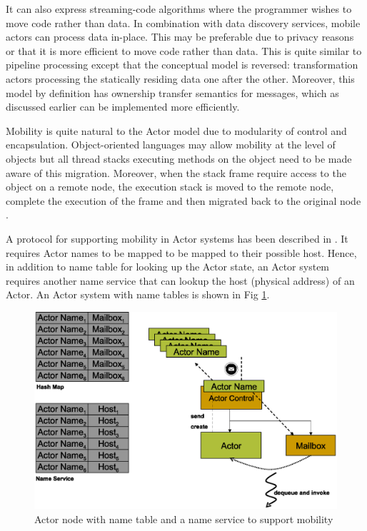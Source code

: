 It can also express streaming-code algorithms where the programmer wishes to move code rather than data. In combination with data discovery services, mobile actors can process data in-place. This may be preferable due to privacy reasons or that it is more efficient to move code rather than data. This is quite similar to pipeline processing except that the conceptual model is reversed: transformation actors processing the statically residing data one after the other. Moreover, this model by definition has ownership transfer semantics for messages, which as discussed earlier can be implemented more efficiently.

Mobility is quite natural to the Actor model due to modularity of control and encapsulation. Object-oriented languages may allow mobility at the level of objects but all thread stacks executing methods on the object need to be made aware of this migration. Moreover, when the stack frame require access to the object on a remote node, the execution stack is moved to the remote node, complete the execution of the frame and then migrated back to the original node \cite{walsh2000spm}.


A protocol for supporting mobility in Actor systems has been described in \cite{sc95}. It requires Actor names to be mapped to be mapped to their possible host. Hence, in addition to name table for looking up the Actor state, an Actor system requires another name service that can lookup the host (physical address) of an Actor. An Actor system with name tables is shown in Fig \ref{mobile_node}.

\begin{figure}%
\centerline
{
\includegraphics[scale=0.4]{images/escape3.eps}
}
\caption{Actor node with name table and a name service to support mobility}
\label{mobile_node}
\end{figure}
